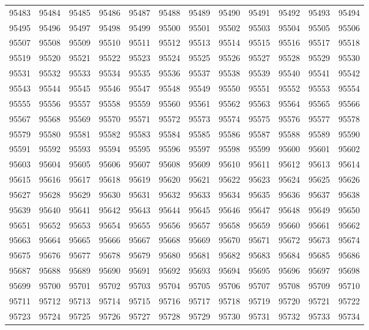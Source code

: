 \begin{center}
\begin{longtable}{llllllllllll}
95483 &95484 &95485 &95486 &95487 &95488 &95489 &95490 &95491 &95492 &95493 &95494 \\
95495 &95496 &95497 &95498 &95499 &95500 &95501 &95502 &95503 &95504 &95505 &95506 \\
95507 &95508 &95509 &95510 &95511 &95512 &95513 &95514 &95515 &95516 &95517 &95518 \\
95519 &95520 &95521 &95522 &95523 &95524 &95525 &95526 &95527 &95528 &95529 &95530 \\
95531 &95532 &95533 &95534 &95535 &95536 &95537 &95538 &95539 &95540 &95541 &95542 \\
95543 &95544 &95545 &95546 &95547 &95548 &95549 &95550 &95551 &95552 &95553 &95554 \\
95555 &95556 &95557 &95558 &95559 &95560 &95561 &95562 &95563 &95564 &95565 &95566 \\
95567 &95568 &95569 &95570 &95571 &95572 &95573 &95574 &95575 &95576 &95577 &95578 \\
95579 &95580 &95581 &95582 &95583 &95584 &95585 &95586 &95587 &95588 &95589 &95590 \\
95591 &95592 &95593 &95594 &95595 &95596 &95597 &95598 &95599 &95600 &95601 &95602 \\
95603 &95604 &95605 &95606 &95607 &95608 &95609 &95610 &95611 &95612 &95613 &95614 \\
95615 &95616 &95617 &95618 &95619 &95620 &95621 &95622 &95623 &95624 &95625 &95626 \\
95627 &95628 &95629 &95630 &95631 &95632 &95633 &95634 &95635 &95636 &95637 &95638 \\
95639 &95640 &95641 &95642 &95643 &95644 &95645 &95646 &95647 &95648 &95649 &95650 \\
95651 &95652 &95653 &95654 &95655 &95656 &95657 &95658 &95659 &95660 &95661 &95662 \\
95663 &95664 &95665 &95666 &95667 &95668 &95669 &95670 &95671 &95672 &95673 &95674 \\
95675 &95676 &95677 &95678 &95679 &95680 &95681 &95682 &95683 &95684 &95685 &95686 \\
95687 &95688 &95689 &95690 &95691 &95692 &95693 &95694 &95695 &95696 &95697 &95698 \\
95699 &95700 &95701 &95702 &95703 &95704 &95705 &95706 &95707 &95708 &95709 &95710 \\
95711 &95712 &95713 &95714 &95715 &95716 &95717 &95718 &95719 &95720 &95721 &95722 \\
95723 &95724 &95725 &95726 &95727 &95728 &95729 &95730 &95731 &95732 &95733 &95734 \\

\end{longtable}
\end{center}
